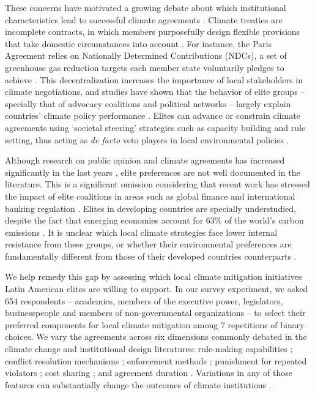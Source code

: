 \documentclass[a4paper,12pt]{article}
\begin{document}
These concerns have motivated a growing debate about which institutional characteristics lead to successful climate agreements \citep[e.g.,][]{bechtel2013mass, bechtel2017interests, keohane2011regime, mitchell2006problem, ostrom2014polycentric}. Climate treaties are incomplete contracts, in which members purposefully design flexible provisions that take domestic circumstances into account \citep[607]{brauninger2000making}. For instance, the Paris Agreement relies on Nationally Determined Contributions (NDCs), a set of greenhouse gas reduction targets each member state voluntarily pledges to achieve \citep{winning2019nationally}. This decentralization increases the importance of local stakeholders in climate negotiations, and studies have shown that the behavior of elite groups -- specially that of advocacy coalitions and political networks -- largely explain countries' climate policy performance \citep{jahn2016politics, karapin2012explaining}. Elites can advance or constrain climate agreements using `societal steering' strategies such as capacity building and rule setting, thus acting as \textit{de facto} veto players in local environmental policies \citep{andonova2009transnational, bulkeley2014transnational}.

Although research on public opinion and climate agreements has increased significantly in the last years \citep[e.g.,][]{aklin2013understanding, bechtel2013mass, bechtel2017interests, mildenberger2017beliefs}, elite preferences are not well documented in the literature. This is a significant omission considering that recent work has stressed the impact of elite coalitions in areas such as global finance and international banking regulation \citep[e.g,][]{chalmers2017banks, pagliari2014leveraged}. Elites in developing countries are specially understudied, despite the fact that emerging economies account for 63\% of the world's carbon emissions \citep{busch2015developing}. It is unclear which local climate strategies face lower internal resistance from these groups, or whether their environmental preferences are fundamentally different from those of their developed countries counterparts \citep[28]{aklin2013understanding}.

We help remedy this gap by assessing which local climate mitigation initiatives Latin American elites are willing to support. In our survey experiment, we asked 654 respondents -- academics, members of the executive power, legislators, businesspeople and members of non-governmental organizations -- to select their preferred components for local climate mitigation among 7 repetitions of binary choices. We vary the agreements across six dimensions commonly debated in the climate change and institutional design literatures: rule-making capabilities \citep{dubash2013developments, massey2014climate}; conflict resolution mechanisms \citep{huntjens2012institutional, ostrom2014polycentric}; enforcement methods \citep{barrett2008climate}; punishment for repeated violators \citep{ostrom1990governing}; cost sharing \citep{bansak2017europeans,bechtel2013mass}; and agreement duration \citep{copelovitch2014design, marcoux2009institutional}. Variations in any of those features can substantially change the outcomes of climate institutions \citep{bodin2017collaborative, ostrom2014polycentric}.
\end{document}
